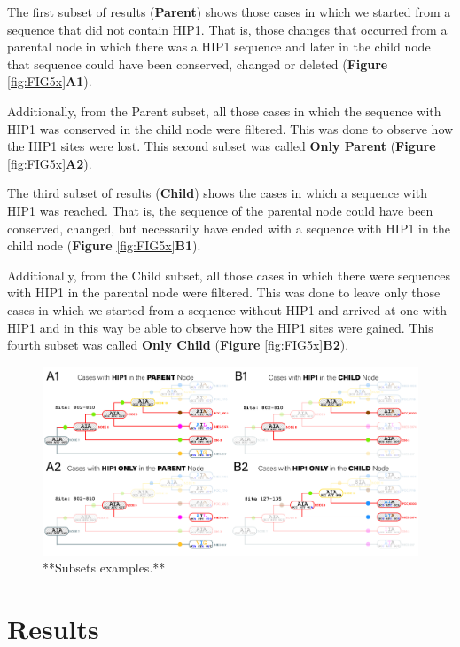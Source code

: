 \documentclass[
]{book}
\begin{document}
The first subset of results (\textbf{Parent}) shows those cases in which we started from a sequence that did not contain HIP1. That is, those changes that occurred from a parental node in which there was a HIP1 sequence and later in the child node that sequence could have been conserved, changed or deleted (\textbf{Figure} \ref{fig:FIG5x}\textbf{A1}).

Additionally, from the Parent subset, all those cases in which the sequence with HIP1 was conserved in the child node were filtered. This was done to observe how the HIP1 sites were lost. This second subset was called \textbf{Only Parent} (\textbf{Figure} \ref{fig:FIG5x}\textbf{A2}).

The third subset of results (\textbf{Child}) shows the cases in which a sequence with HIP1 was reached. That is, the sequence of the parental node could have been conserved, changed, but necessarily have ended with a sequence with HIP1 in the child node (\textbf{Figure} \ref{fig:FIG5x}\textbf{B1}).

Additionally, from the Child subset, all those cases in which there were sequences with HIP1 in the parental node were filtered. This was done to leave only those cases in which we started from a sequence without HIP1 and arrived at one with HIP1 and in this way be able to observe how the HIP1 sites were gained. This fourth subset was called \textbf{Only Child} (\textbf{Figure} \ref{fig:FIG5x}\textbf{B2}).

\begin{figure}
\includegraphics[width=1\linewidth]{figures/4x/node_cases} \caption{**Subsets examples.**}\label{fig:FIG6x}
\end{figure}

\hypertarget{results}{%
\chapter{Results}\label{results}}
\end{document}
